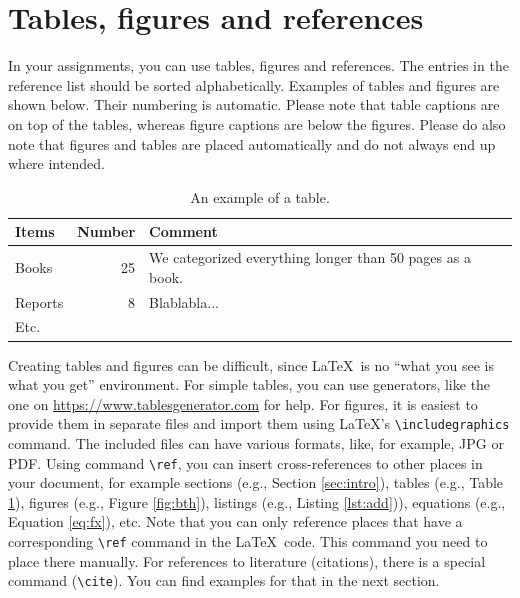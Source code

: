 \documentclass[12pt,a4paper]{article}
\begin{document}
\section{Tables, figures and references}
\label{sec:tab}
In your assignments, you can use tables, figures and references. The entries in the reference list should be sorted alphabetically. Examples of tables and figures are shown below. Their numbering is automatic. Please note that table captions are on top of the tables, whereas figure captions are below the figures.
Please do also note that figures and tables are placed automatically and do not always end up where intended.

\begin{table}[bth]
\centering
\caption{An example of a table.}
\label{tab:ex}
\begin{tabular}{|l|r|p{6cm}|}
\hline
\textbf{Items} & \textbf{Number} & \textbf{Comment} \\
\hline
Books & 25 & We categorized everything longer than 50 pages as a book. \\
\hline
Reports & 8 & Blablabla... \\ 
\hline
Etc. & & \\
\hline 
\end{tabular}
\end{table}

Creating tables and figures can be difficult, since \LaTeX\ is no ``what you see is what you get'' environment. For simple tables, you can use generators, like the one on  \url{https://www.tablesgenerator.com} for help. For figures, it is easiest to provide them in separate files and import them using \LaTeX's \texttt{\textbackslash includegraphics} command. The included files can have various formats, like, for example, JPG or PDF.
Using command \texttt{\textbackslash ref}, you can insert cross-references to other places in your document, for example sections (e.g., Section \ref{sec:intro}), tables (e.g., Table \ref{tab:ex}), figures (e.g., Figure \ref{fig:bth}), listings (e.g., Listing \ref{lst:add})), equations (e.g., Equation \ref{eq:fx}), etc. Note that you can only reference places that have a corresponding \texttt{\textbackslash ref} command in the \LaTeX\ code. This command you need to place there manually. For references to literature (citations), there is a special command (\texttt{\textbackslash cite}). You can find examples for that in the next section.
\end{document}
